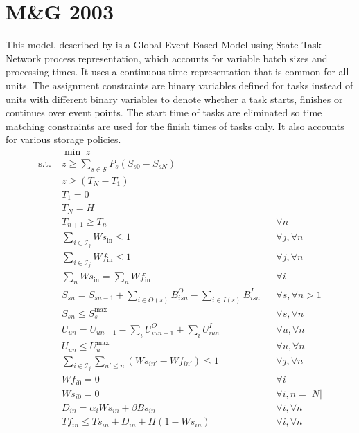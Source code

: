 \section{M\&G 2003}
This model, described by \cite{Maravelias} is a Global Event-Based Model using State Task Network process representation, which accounts for variable batch sizes and processing times. It uses a continuous time representation that is common for all units. The assignment constraints are binary variables defined for tasks instead of units with different binary variables to denote whether a task starts, finishes or continues over event points. The start time of tasks are eliminated so time matching constraints are used for the finish times of tasks only. It also accounts for various storage policies.
\begin{align}
&\min \; z &&\\
\text{s.t.}\; &z \ge \sum_{s\in \mathcal{S}} P_s (S_{s0} - S_{sN}) && \\
		  & z \ge (T_N - T_1)  &&\\
		  & T_1 = 0 && \\
		  & T_N = H && \\
		  & T_{n+1} \ge T_n && \forall n \\
		  & \sum_{i \in \mathcal{I}_j} Ws_{\text{in}} \le 1 && \forall j, \forall n \\
		  & \sum_{i \in \mathcal{I}_j} Wf_{\text{in}} \le 1 && \forall j, \forall n \\
		  & \sum_n Ws_{\text{in}} = \sum_n Wf_{\text{in}} && \forall i \\
		  & S_{sn} = S_{sn-1} + \sum_{i \in O(s)} B_{isn}^O - \sum_{i \in I(s)} B_{isn}^I && \forall s, \forall n > 1 \\
		  & S_{sn} \le S_{s}^{\text{max}} && \forall s, \forall n \\
		  & U_{un} = U_{un-1} - \sum_i U_{iun-1}^O + \sum_i U_{iun}^I && \forall u, \forall n\\
		  & U_{un} \le U_{u}^{\text{max}} && \forall u, \forall n \\
		  & \sum_{i \in \mathcal{I}_j} \sum_{n' \le n} (Ws_{in'} - Wf_{in'}) \le 1 && \forall j, \forall n \\
		  & Wf_{i0} = 0 && \forall i \\
		  & Ws_{i0} = 0 && \forall i , n = |N| \\
		  & D_{in} = \alpha_i Ws_{in} + \beta Bs_{in} && \forall i, \forall n \\
		  & Tf_{in} \le Ts_{in} + D_{in} + H(1 - Ws_{in}) && \forall i, \forall n \\

\end{align}
